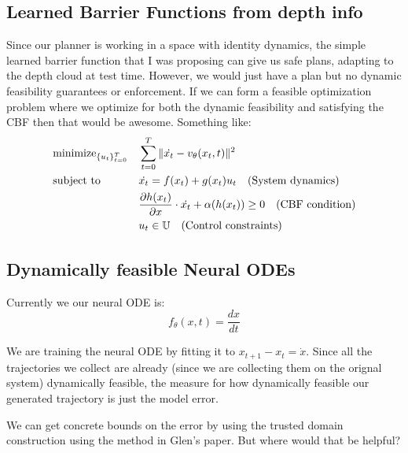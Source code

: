 \documentclass[12pt]{article}
\begin{document}
\subsection{Learned Barrier Functions from depth info}
Since our planner is working in a space with identity dynamics, the simple learned barrier function that I was proposing can give us safe plans, adapting to the depth cloud at test time. However, we would just have a plan but no dynamic feasibility guarantees or enforcement. If we can form a feasible optimization problem where we optimize for both the dynamic feasibility and satisfying the CBF then that would be awesome. 
Something like:
\[
\begin{aligned}
    &\text{minimize}_{\{u_t\}_{t=0}^T} && \sum_{t=0}^{T} \|\dot{x_{t}} - v_{\theta}(x_{t}, t)\|^2 \notag \\
    &\text{subject to} && \dot{x_{t}} = f(x_{t}) + g(x_{t})u_{t} \quad \text{(System dynamics)} \notag \\
    &&& \frac{\partial h(x_{t})}{\partial x} \cdot \dot{x_{t}} + \alpha(h(x_{t})) \geq 0 \quad \text{(CBF condition)} \notag \\
    &&& u_{t} \in \mathbb{U} \quad \text{(Control constraints)} \notag \\
\end{aligned}
\]

\subsection{Dynamically feasible Neural ODEs}
Currently we our neural ODE is: \[f_\theta(x, t) = \frac{dx}{dt}\]

We are training the neural ODE by fitting it to \(x_{t+1} - x_{t} = \dot{x}\). Since all the trajectories we collect are already  (since we are collecting them on the orignal system) dynamically feasible, the measure for how dynamically feasible our generated trajectory is just the model error. 

We can get concrete bounds on the error by using the trusted domain construction using the method in Glen's paper. But where would that be helpful?
\end{document}
